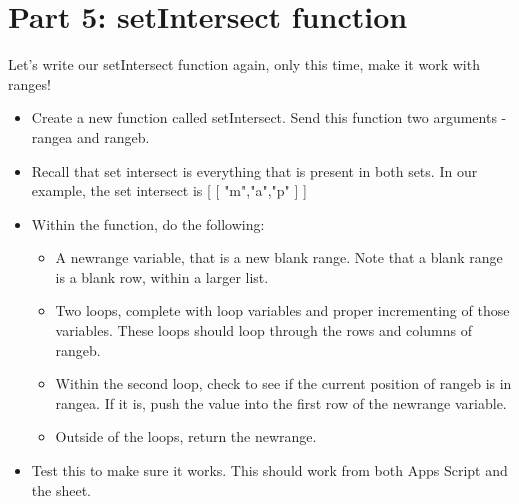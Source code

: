 \documentclass{article}
\begin{document}
\section*{Part 5: setIntersect function}
Let's write our setIntersect function again, only this time, make it work with ranges!
\begin{itemize}
    \item Create a new function called setIntersect.  Send this function two arguments - rangea and rangeb.
    \item Recall that set intersect is everything that is present in both sets. In our example, the set intersect is [ [ "m","a","p" ] ]
    \item Within the function, do the following:
    \begin{itemize}
    		\item A newrange variable, that is a new blank range.  Note that a blank range is a blank row, within a larger list.
    		\item Two loops, complete with loop variables and proper incrementing of those variables.  These loops should loop through the rows and columns of rangeb.
    		\item Within the second loop, check to see if the current position of rangeb is in rangea.  If it is, push the value into the first row of the newrange variable.
    		\item Outside of the loops, return the newrange.
    	\end{itemize}
    	\item Test this to make sure it works.  This should work from both Apps Script and the sheet.
\end{itemize}
\end{document}
